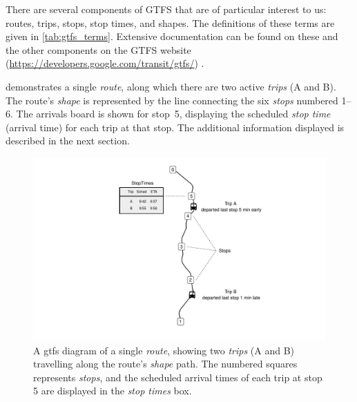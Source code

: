 There are several components of GTFS that are of particular interest to us: routes, trips, stops, stop times, and shapes. The definitions of these terms are given in \cref{tab:gtfs_terms}. Extensive documentation can be found on these and the other components on the GTFS website (\url{https://developers.google.com/transit/gtfs/}) \citep{GoogleDevelopers_2006}.


 demonstrates a single \emph{route}, along which there are two active \emph{trips} (A and B). The route's \emph{shape} is represented by the line connecting the six \emph{stops} numbered 1--6. The \rt{} arrivals board is shown for stop~5, displaying the scheduled \emph{stop time} (arrival time) for each trip at that stop. The additional information displayed is described in the next section.



\begin{knitrout}\small
{}\color{fgcolor}\begin{figure}

{\centering \includegraphics[width=\textwidth]{figure/gtfs_nw-1} 

}

\caption{A \gls{gtfs} diagram of a single \emph{route}, showing two \emph{trips} (A and B) travelling along the route's \emph{shape} path. The numbered squares represents \emph{stops}, and the scheduled arrival times of each trip at stop 5 are displayed in the \emph{stop times} box.}\label{fig:gtfs_nw}
\end{figure}


\end{knitrout}

\begin{knitrout}\small
{}\color{fgcolor}\begin{kframe}


{\ttfamily\noindent\itshape\color{messagecolor}{\#\# Loading required namespace: transitr}}\end{kframe}
\end{knitrout}

